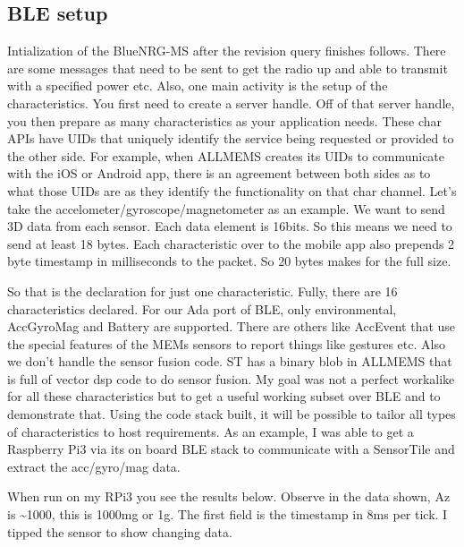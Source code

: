 \documentclass[11pt]{article}
\numberwithin{figure}{section}
\begin{document}
\subsection{BLE setup}
Intialization of the BlueNRG-MS after the revision query finishes
follows. There are some messages that need to be sent to get the radio
up and able to transmit with a specified power etc. Also, one main
activity is the setup of the characteristics. You first need to create
a server handle. Off of that server handle, you then prepare as many
characteristics as your application needs. These char APIs have UIDs
that uniquely identify the service being requested or provided to the
other side. For example, when ALLMEMS creates its UIDs to communicate
with the iOS or Android app, there is an agreement between both sides
as to what those UIDs are as they identify the functionality on that
char channel. Let's take the accelometer/gyroscope/magnetometer as an
example. We want to send 3D data from each sensor. Each data element
is 16bits. So this means we need to send at least 18 bytes. Each
characteristic over to the mobile app also prepends 2 byte timestamp
in milliseconds to the packet. So 20 bytes makes for the full size.

{
\selectfont

}

So that is the declaration for just one characteristic. Fully, there
are 16 characteristics declared. For our Ada port of BLE, only
environmental, AccGyroMag and Battery are supported. There are others
like AccEvent that use the special features of the MEMs sensors to
report things like gestures etc. Also we don't handle the sensor
fusion code. ST has a binary blob in ALLMEMS that is full of vector
dsp code to do sensor fusion. My goal was not a perfect workalike for
all these characteristics but to get a useful working subset over
BLE and to demonstrate that. Using the code stack built, it will be
possible to tailor all types of characteristics to host
requirements. As an example, I was able to get a Raspberry Pi3 via its
on board BLE stack to communicate with a SensorTile and extract the
acc/gyro/mag data.

{
\selectfont

}

When run on my RPi3 you see the results below. Observe in the data shown,
Az is \textasciitilde{1000}, this is 1000mg or 1g. The first field is the timestamp in
8ms per tick. I tipped the sensor to show changing data.

{
\selectfont

}
\end{document}
